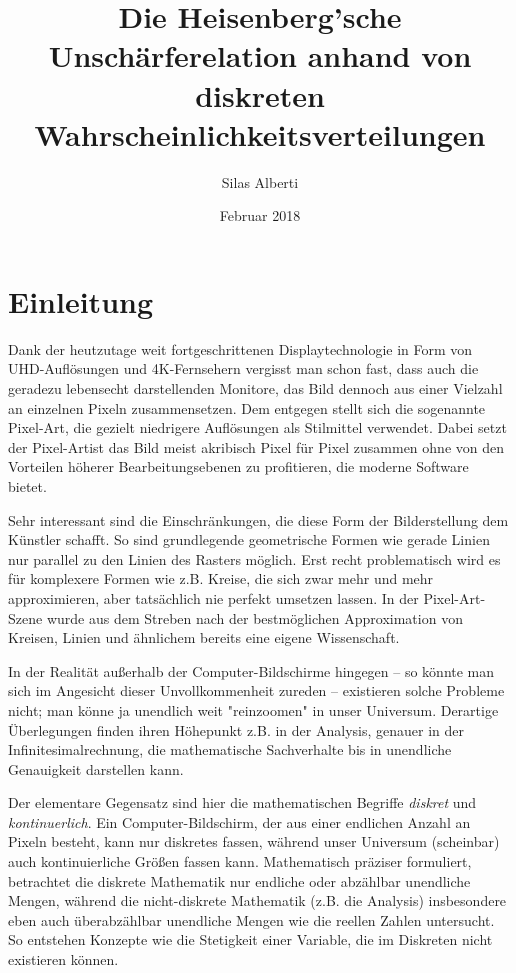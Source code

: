\documentclass[a4paper,12pt,ngerman]{scrartcl}
\title{Die Heisenberg'sche Unschärferelation anhand von diskreten Wahrscheinlichkeitsverteilungen}
\author{Silas Alberti}
\date{Februar 2018}
\theoremstyle{plain}
\theoremstyle{plain}
\theoremstyle{plain}
\theoremstyle{plain}
\begin{document}
\maketitle

\tableofcontents

\thispagestyle{empty}
\clearpage
\setcounter{page}{1}

\section{Einleitung}

Dank der heutzutage weit fortgeschrittenen Displaytechnologie in Form von UHD-Auflösungen und 4K-Fernsehern vergisst man schon fast, dass auch die geradezu lebensecht darstellenden Monitore, das Bild dennoch aus einer Vielzahl an einzelnen Pixeln zusammensetzen. Dem entgegen stellt sich die sogenannte Pixel-Art, die gezielt niedrigere Auflösungen als Stilmittel verwendet. Dabei setzt der Pixel-Artist das Bild meist akribisch Pixel für Pixel zusammen ohne von den Vorteilen höherer Bearbeitungsebenen zu profitieren, die moderne Software bietet.


Sehr interessant sind die Einschränkungen, die diese Form der Bilderstellung dem Künstler schafft. So sind grundlegende geometrische Formen wie gerade Linien nur parallel zu den Linien des Rasters möglich. Erst recht problematisch wird es für komplexere Formen wie z.B. Kreise, die sich zwar mehr und mehr approximieren, aber tatsächlich nie perfekt umsetzen lassen. In der Pixel-Art-Szene wurde aus dem Streben nach der bestmöglichen Approximation von Kreisen, Linien und ähnlichem bereits eine eigene Wissenschaft.


In der Realität außerhalb der Computer-Bildschirme hingegen -- so könnte man sich im Angesicht dieser Unvollkommenheit zureden -- existieren solche Probleme nicht; man könne ja unendlich weit "reinzoomen" in unser Universum. Derartige Überlegungen finden ihren Höhepunkt z.B. in der Analysis, genauer in der Infinitesimalrechnung, die mathematische Sachverhalte bis in unendliche Genauigkeit darstellen kann. 

Der elementare Gegensatz sind hier die mathematischen Begriffe \textit{diskret} und \textit{kontinuerlich}. Ein Computer-Bildschirm, der aus einer endlichen Anzahl an Pixeln besteht, kann nur diskretes fassen, während unser Universum (scheinbar) auch kontinuierliche Größen fassen kann. Mathematisch präziser formuliert, betrachtet die diskrete Mathematik nur endliche oder abzählbar unendliche Mengen, während die nicht-diskrete Mathematik (z.B. die Analysis) insbesondere eben auch überabzählbar unendliche Mengen wie die reellen Zahlen untersucht. So entstehen Konzepte wie die Stetigkeit einer Variable, die im Diskreten nicht existieren können.
\end{document}
